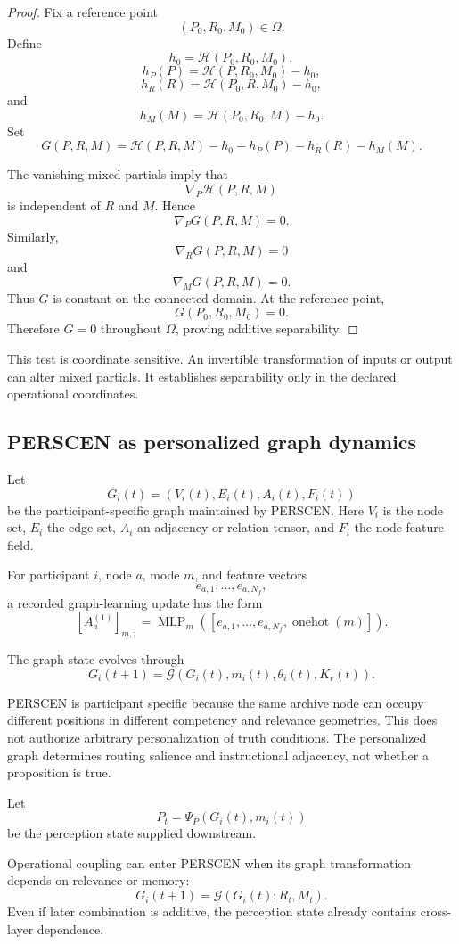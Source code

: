 \documentclass[11pt]{article}
\theoremstyle{definition}
\newcommand{\Hh}{\mathcal{H}}
\begin{document}
\begin{proof}
Fix a reference point
\[
(P_0,R_0,M_0)\in\Omega.
\]
Define
\[
h_0
=
\Hh(P_0,R_0,M_0),
\]
\[
h_P(P)
=
\Hh(P,R_0,M_0)-h_0,
\]
\[
h_R(R)
=
\Hh(P_0,R,M_0)-h_0,
\]
and
\[
h_M(M)
=
\Hh(P_0,R_0,M)-h_0.
\]
Set
\[
G(P,R,M)
=
\Hh(P,R,M)
-
h_0-h_P(P)-h_R(R)-h_M(M).
\]

The vanishing mixed partials imply that
\[
\nabla_P\Hh(P,R,M)
\]
is independent of \(R\) and \(M\). Hence
\[
\nabla_PG(P,R,M)=0.
\]
Similarly,
\[
\nabla_RG(P,R,M)=0
\]
and
\[
\nabla_MG(P,R,M)=0.
\]
Thus \(G\) is constant on the connected domain. At the reference point,
\[
G(P_0,R_0,M_0)=0.
\]
Therefore \(G=0\) throughout \(\Omega\), proving additive separability.
\end{proof}

This test is coordinate sensitive. An invertible transformation of inputs or output can alter mixed partials. It establishes separability only in the declared operational coordinates.

\subsection{PERSCEN as personalized graph dynamics}

Let
\[
G_i(t)
=
(V_i(t),E_i(t),A_i(t),F_i(t))
\]
be the participant-specific graph maintained by PERSCEN. Here \(V_i\) is the node set, \(E_i\) the edge set, \(A_i\) an adjacency or relation tensor, and \(F_i\) the node-feature field.

For participant \(i\), node \(a\), mode \(m\), and feature vectors
\[
e_{a,1},\ldots,e_{a,N_f},
\]
a recorded graph-learning update has the form
\[
[A_a^{(1)}]_{m,:}
=
\operatorname{MLP}_m
\left(
[
e_{a,1},
\ldots,
e_{a,N_f},
\operatorname{onehot}(m)
]
\right).
\]

The graph state evolves through
\[
G_i(t+1)
=
\mathcal G
\left(
G_i(t),
m_i(t),
\theta_i(t),
K_r(t)
\right).
\]

PERSCEN is participant specific because the same archive node can occupy different positions in different competency and relevance geometries. This does not authorize arbitrary personalization of truth conditions. The personalized graph determines routing salience and instructional adjacency, not whether a proposition is true.

Let
\[
P_t
=
\Psi_P(G_i(t),m_i(t))
\]
be the perception state supplied downstream.

Operational coupling can enter PERSCEN when its graph transformation depends on relevance or memory:
\[
G_i(t+1)
=
\mathcal G
\left(
G_i(t);
R_t,M_t
\right).
\]
Even if later combination is additive, the perception state already contains cross-layer dependence.
\end{document}
